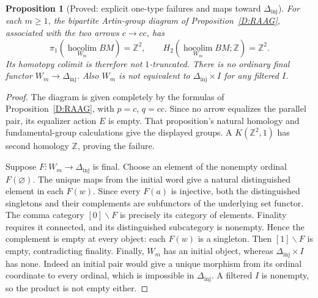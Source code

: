 \documentclass[11pt,a4paper]{article}
\newcommand{\Z}{\mathbb Z}
\newcommand{\hocolim}{\operatorname*{hocolim}}
\newcommand{\Dinj}{\Delta_{\mathrm{inj}}}
\newtheorem{proposition}[theorem]{Proposition}
\theoremstyle{definition}
\begin{document}
\begin{proposition}[Proved: explicit one-type failures and maps toward $\Dinj$]\label{E:word-tests}
For each $m\geq1$, the bipartite Artin-group diagram of
Proposition~\ref{D:RAAG}, associated with the two arrows
$c\to cc$, has
\[
\pi_1(\hocolim_{W_m}BM)=\Z^2,\qquad
H_2(\hocolim_{W_m}BM;\Z)=\Z^2.
\]
Its homotopy colimit is therefore not $1$-truncated.
There is no ordinary final functor $W_m\to\Dinj$. Also $W_m$
is not equivalent to $\Dinj\times I$ for any filtered $I$.
\end{proposition}
\begin{proof}
The diagram is given completely by the formulas of
Proposition~\ref{D:RAAG}, with $p=c$, $q=cc$. Since no arrow
equalizes the parallel pair, its equalizer action $E$ is empty.
That proposition's natural homology and fundamental-group
calculations give the displayed groups. A $K(\Z^2,1)$ has second
homology $\Z$, proving the failure.

Suppose $F:W_m\to\Dinj$ is final. Choose an element of the
nonempty ordinal $F(\varnothing)$. The unique maps from the
initial word give a natural distinguished element in each
$F(w)$. Since every $F(a)$ is injective, both the distinguished
singletons and their complements are subfunctors of the underlying
set functor. The comma category $[0]\backslash F$ is precisely
its category of elements. Finality requires it connected, and
its distinguished subcategory is nonempty. Hence the complement
is empty at every object: each $F(w)$ is a singleton. Then
$[1]\backslash F$ is empty, contradicting finality.
Finally, $W_m$ has an initial object, whereas $\Dinj\times I$
has none. Indeed an initial pair would give a unique morphism
from its ordinal coordinate to every ordinal, which is impossible
in $\Dinj$. A filtered $I$ is nonempty, so the product is not
empty either.
\end{proof}
\end{document}
